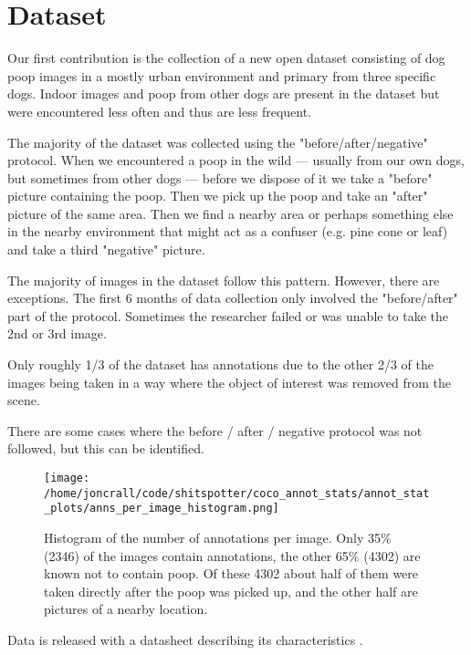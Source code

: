 \documentclass[10pt,twocolumn,letterpaper]{article}
\begin{document}


\section{Dataset}

Our first contribution is the collection of a new open dataset consisting of
dog poop images in a mostly urban environment and primary from three specific
dogs. Indoor images and poop from other dogs are present in the dataset but
were encountered less often and thus are less frequent.

The majority of the dataset was collected using the "before/after/negative"
protocol.
When we encountered a poop in the wild --- usually from our own dogs, but
sometimes from other dogs --- before we dispose of it we 
take a "before" picture containing the poop.
Then we pick up the poop and take an "after" picture of the same area. 
Then we find a nearby area or perhaps something else in the nearby environment
that might act as a confuser (e.g. pine cone or leaf) and take a third
"negative" picture.

The majority of images in the dataset follow this pattern. However, there are exceptions.
The first 6 months of data collection only involved the "before/after" part of the protocol.
Sometimes the researcher failed or was unable to take the 2nd or 3rd image.


Only roughly 1/3 of the dataset has annotations due to the other 2/3 of the
images being taken in a way where the object of interest was removed from the
scene.

There are some cases where the before / after / negative protocol was not followed, but this can be identified.


\begin{figure}[h]
\centering
\texttt{[image: /home/joncrall/code/shitspotter/coco\_annot\_stats/annot\_stat\_plots/anns\_per\_image\_histogram.png]}
\caption[]{
    Histogram of the number of annotations per image. 
    Only 35\% (2346) of the images contain annotations, the other 65\% (4302)
    are known not to contain poop. Of these 4302 about half of them were taken
    directly after the poop was picked up, and the other half are pictures of a
    nearby location. 
}
\label{fig:AnnotsPerImage}
\end{figure}


Data is released with a datasheet describing its characteristics \cite{gebru_datasheets_2021}.
\end{document}
